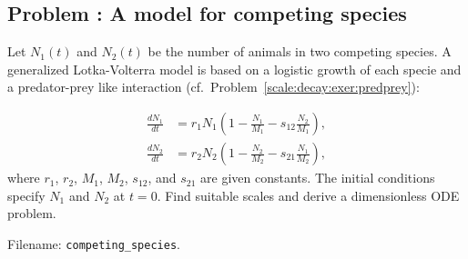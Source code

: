 \documentclass[graybox,envcountchap,sectrefs,final]{svmonodo}
\newcounter{doconce:movie:counter}
\newenvironment{doconceexercise}{}{}
\newcounter{doconceexercisecounter}
\begin{document}
\begin{doconceexercise}

\subsection*{Problem \thedoconceexercisecounter: A model for competing species}

\label{scale:decay:exer:competing_species}


Let $N_1(t)$ and $N_2(t)$ be the number of animals in two
competing species. A generalized Lotka-Volterra model
is based on a logistic growth of each specie and a predator-prey like
interaction (cf.~Problem~\ref{scale:decay:exer:predprey}):

\begin{align}
\frac{dN_1}{dt} &= r_1N_1\left( 1 - \frac{N_1}{M_1} - s_{12}\frac{N_2}{M_1}\right),\\ 
\frac{dN_2}{dt} &= r_2N_2\left( 1 - \frac{N_2}{M_2} - s_{21}\frac{N_1}{M_2}\right),
\end{align}
where $r_1$, $r_2$, $M_1$, $M_2$, $s_{12}$, and $s_{21}$ are given constants.
The initial conditions specify $N_1$ and $N_2$ at $t=0$.
Find suitable scales and derive a dimensionless ODE problem.


\noindent Filename: \Verb!competing_species!.

\end{doconceexercise}
\end{document}
